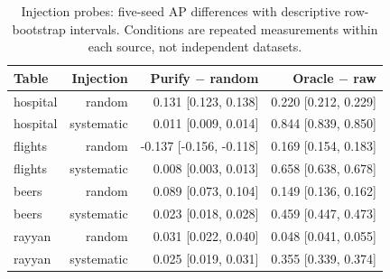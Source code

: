\begin{table}[t]
\centering\small
\setlength{\tabcolsep}{3.5pt}
\caption{Injection probes: five-seed AP differences with descriptive row-bootstrap intervals. Conditions are repeated measurements within each source, not independent datasets.}
\label{tab:probes}
\begin{tabular}{lrrr}
\toprule
Table & Injection & Purify $-$ random & Oracle $-$ raw \\
\midrule
hospital & random & 0.131 [0.123, 0.138] & 0.220 [0.212, 0.229] \\
hospital & systematic & 0.011 [0.009, 0.014] & 0.844 [0.839, 0.850] \\
flights & random & -0.137 [-0.156, -0.118] & 0.169 [0.154, 0.183] \\
flights & systematic & 0.008 [0.003, 0.013] & 0.658 [0.638, 0.678] \\
beers & random & 0.089 [0.073, 0.104] & 0.149 [0.136, 0.162] \\
beers & systematic & 0.023 [0.018, 0.028] & 0.459 [0.447, 0.473] \\
rayyan & random & 0.031 [0.022, 0.040] & 0.048 [0.041, 0.055] \\
rayyan & systematic & 0.025 [0.019, 0.031] & 0.355 [0.339, 0.374] \\
\bottomrule
\end{tabular}
\end{table}
